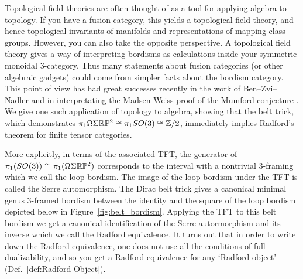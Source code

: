 \documentclass{amsart}
\begin{document}
Topological field theories are often thought of as a tool for applying algebra to topology.  If you have a fusion category, this yields a topological field theory, and hence topological invariants of manifolds and representations of mapping class groups.  However, you can also take the opposite perspective.  A topological field theory gives a way of interpreting bordisms as calculations inside your symmetric monoidal $3$-category.  Thus many statements about fusion categories (or other algebraic gadgets) could come from simpler facts about the bordism category.  This point of view has had great successes recently in the work of Ben--Zvi--Nadler \cite{0904.1247} and in interpretating the Madsen-Weiss proof of the Mumford conjecture \cite{MR2335797, lurie-ch}.  We give one such application of topology to algebra, showing that the belt trick, which demonstrates $\pi_1 \Omega \Sigma \mathbb R \mathbb P^2 \cong \pi_1 SO(3) \cong \mathbb{Z}/2$, immediately implies Radford's theorem for finite tensor categories.

More explicitly, in terms of the associated TFT, the generator of $\pi_1(SO(3)) \cong \pi_1(\Omega \Sigma \mathbb R \mathbb P^2)$ corresponds to the interval with a nontrivial $3$-framing which we call the loop bordism.  The image of the loop bordism under the TFT is called the Serre automorphism.  The Dirac belt trick gives a canonical minimal genus $3$-framed bordism between the identity and the square of the loop bordism depicted below in Figure~\ref{fig:belt_bordism}.  Applying the TFT to this belt bordism we get a canonical identification of the Serre autormorphism and its inverse which we call the Radford equivalence.  It turns out that in order to write down the Radford equivalence, one does not use all the conditions of full dualizability, and so you get a Radford equivalence for any `Radford object' (Def.~\ref{def:Radford-Object}).  
\end{document}

